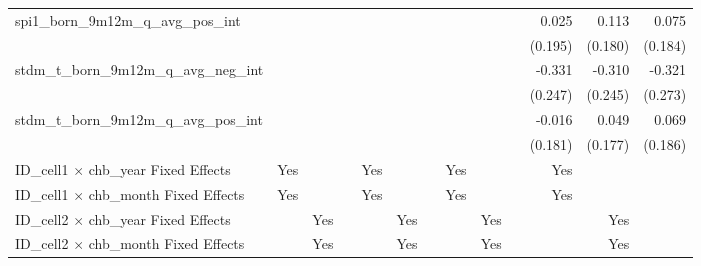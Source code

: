 \begin{tabular}{lrrrrrrrrrrrr}
spi1\_born\_9m12m\_q\_avg\_pos\_int         &              &              &              &              &              &              &              &              &              &        0.025 &        0.113 &        0.075 \\ 
                                            &              &              &              &              &              &              &              &              &              &      (0.195) &      (0.180) &      (0.184) \\ 
stdm\_t\_born\_9m12m\_q\_avg\_neg\_int      &              &              &              &              &              &              &              &              &              &       -0.331 &       -0.310 &       -0.321 \\ 
                                            &              &              &              &              &              &              &              &              &              &      (0.247) &      (0.245) &      (0.273) \\ 
stdm\_t\_born\_9m12m\_q\_avg\_pos\_int      &              &              &              &              &              &              &              &              &              &       -0.016 &        0.049 &        0.069 \\ 
                                            &              &              &              &              &              &              &              &              &              &      (0.181) &      (0.177) &      (0.186) \\ 
\midrule
ID\_cell1 $\times$ chb\_year Fixed Effects  &          Yes &              &              &          Yes &              &              &          Yes &              &              &          Yes &              &              \\ 
ID\_cell1 $\times$ chb\_month Fixed Effects &          Yes &              &              &          Yes &              &              &          Yes &              &              &          Yes &              &              \\ 
ID\_cell2 $\times$ chb\_year Fixed Effects  &              &          Yes &              &              &          Yes &              &              &          Yes &              &              &          Yes &              \\ 
ID\_cell2 $\times$ chb\_month Fixed Effects &              &          Yes &              &              &          Yes &              &              &          Yes &              &              &          Yes &              \\ 

\end{tabular}

